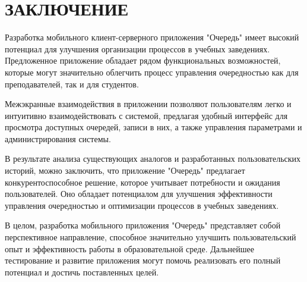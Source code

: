 \chapter*{ЗАКЛЮЧЕНИЕ}
Разработка мобильного клиент-серверного приложения "Очередь"
имеет высокий потенциал для улучшения организации процессов
в учебных заведениях.
Предложенное приложение обладает рядом функциональных возможностей,
которые могут значительно облегчить процесс управления очередностью
как для преподавателей, так и для студентов.\par
Межэкранные взаимодействия в приложении позволяют пользователям легко
и интуитивно взаимодействовать с системой, предлагая удобный интерфейс
для просмотра доступных очередей, записи в них,
а также управления параметрами и администрирования системы.\par
В результате анализа существующих аналогов и разработанных пользовательских
историй, можно заключить, что приложение "Очередь"
предлагает конкурентоспособное решение,
которое учитывает потребности и ожидания пользователей.
Оно обладает потенциалом для улучшения эффективности управления очередностью
и оптимизации процессов в учебных заведениях.\par
В целом, разработка мобильного приложения "Очередь"
представляет собой перспективное направление,
способное значительно улучшить пользовательский опыт
и эффективность работы в образовательной среде.
Дальнейшее тестирование и развитие приложения могут помочь реализовать
его полный потенциал и достичь поставленных целей.\par

\label{lastpage}

